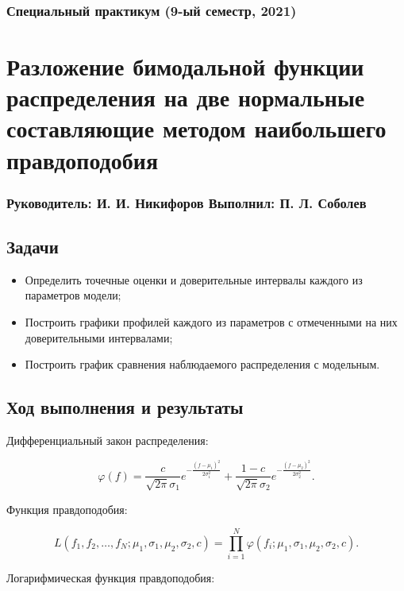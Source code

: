 \documentclass[a4paper, oneside]{article}
\newcommand{\sd}{\vspace{0.5em}}
\begin{document}
\subsubsection*{Специальный практикум (9-ый семестр, 2021)}
\section*{Разложение бимодальной функции распределения на две нормальные составляющие методом наибольшего правдоподобия}
\subsubsection*{Руководитель: И. И. Никифоров \hspace{2em} Выполнил: П. Л. Соболев}

\vspace{3em}

\subsection*{Задачи}

\begin{itemize}
  \setlength\itemsep{-0.1em}
  \item Определить точечные оценки и доверительные интервалы каждого из параметров модели;
  \item Построить графики профилей каждого из параметров с отмеченными на них доверительными интервалами;
  \item Построить график сравнения наблюдаемого распределения с модельным.
\end{itemize}

\subsection*{Ход выполнения и результаты}

Дифференциальный закон распределения:

$$
\varphi(f) = \frac{c}{\sqrt{2 \pi} \sigma_1} e^{\displaystyle -\frac{(f - \mu_1)^2}{2 \sigma_1^2}} + \frac{1 - c}{\sqrt{2 \pi} \sigma_2} e^{\displaystyle -\frac{(f - \mu_2)^2}{2 \sigma_2^2}}.
$$
\sd

Функция правдоподобия:

$$
L(f_1, f_2, \ldots, f_N; \mu_1, \sigma_1, \mu_2, \sigma_2, c) = \prod_{i=1}^{N} \varphi(f_i; \mu_1, \sigma_1, \mu_2, \sigma_2, c).
$$

Логарифмическая функция правдоподобия:
\end{document}
